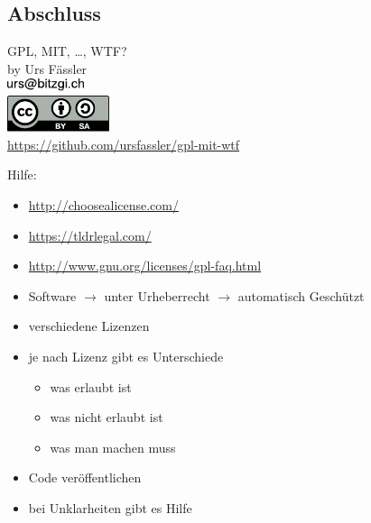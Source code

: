 
\subsection{Abschluss}
\label{sec:zusammenfassung}
\subsectionframe

\begin{frame}
	\begin{center}
		{\large GPL, MIT, \ldots, WTF?}\\
		\vspace{0.5em}
		by Urs Fässler\\
		\includegraphics[width=2.25cm]{res/mail.pdf}\\
		\pause
		\vspace{0.5em}
		\includegraphics[width=3cm]{res/cc-by-sa.pdf}\\
		\pause
		\vspace{1em}
		\url{https://github.com/ursfassler/gpl-mit-wtf}\\
	\end{center}

	\pause
	Hilfe:
	\begin{itemize}
		\pause
		\item \url{http://choosealicense.com/}
		\pause
		\item \url{https://tldrlegal.com/}
		\pause
		\item \url{http://www.gnu.org/licenses/gpl-faq.html}
	\end{itemize}
\end{frame}
\note
{
	\begin{itemize}
		\item Software $\rightarrow$ unter Urheberrecht $\rightarrow$ automatisch Geschützt
		\item verschiedene Lizenzen
		\item je nach Lizenz gibt es Unterschiede
		\begin{itemize}
			\item was erlaubt ist
			\item was nicht erlaubt ist
			\item was man machen muss
		\end{itemize}
		\item Code veröffentlichen
		\item bei Unklarheiten gibt es Hilfe
	\end{itemize}
}
